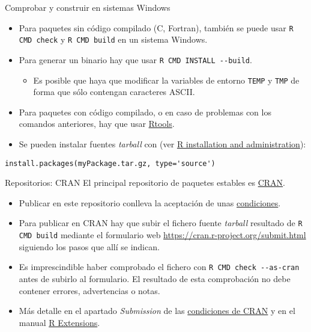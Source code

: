 \documentclass[xcolor={usenames,svgnames,dvipsnames}]{beamer}
\begin{document}
\begin{frame}[fragile,label={sec:org7257dd9}]{Comprobar y construir en sistemas Windows}
 \begin{itemize}
\item Para paquetes sin código compilado (C, Fortran), también se puede usar
\texttt{R CMD check} y \texttt{R CMD build} en un sistema Windows.
\item Para generar un binario hay que usar \texttt{R CMD INSTALL -{}-build}.
\begin{itemize}
\item Es posible que haya que modificar la variables de entorno
\texttt{TEMP} y \texttt{TMP} de forma que \alert{sólo} contengan caracteres ASCII.
\end{itemize}
\item Para paquetes con código compilado, o en caso de problemas con
los comandos anteriores, hay que usar \href{http://cran.r-project.org/bin/windows/Rtools/}{Rtools}.
\item Se pueden instalar fuentes \emph{tarball} con (ver \href{http://cran.r-project.org/doc/manuals/R-admin.html\#Windows-packages}{R installation and administration}):
\end{itemize}
\begin{verbatim}
install.packages(myPackage.tar.gz, type='source')
\end{verbatim}
\end{frame}


\begin{frame}[fragile,label={sec:orgcb384dd}]{Repositorios: CRAN}
 El principal repositorio de paquetes estables es \href{http://cran.r-project.org/}{CRAN}.
\begin{itemize}
\item Publicar en este repositorio conlleva la aceptación de unas \href{http://cran.r-project.org/web/packages/policies.html}{condiciones}.
\item Para publicar en CRAN hay que subir el fichero fuente \emph{tarball}
resultado de \texttt{R CMD build} mediante el formulario web
\url{https://cran.r-project.org/submit.html} siguiendo los pasos que
allí se indican.
\item Es imprescindible haber comprobado el fichero con \texttt{R CMD check
    -{}-as-cran} antes de subirlo al formulario. El resultado de
esta comprobación \alert{no} debe contener errores, advertencias o notas.
\item Más detalle en el apartado \emph{Submission} de las \href{http://cran.r-project.org/web/packages/policies.html}{condiciones de
CRAN} y en el manual \href{http://cran.r-project.org/doc/manuals/R-exts.html\\\#Submitting-a-package-to-CRAN}{R Extensions}.
\end{itemize}
\end{frame}
\end{document}
